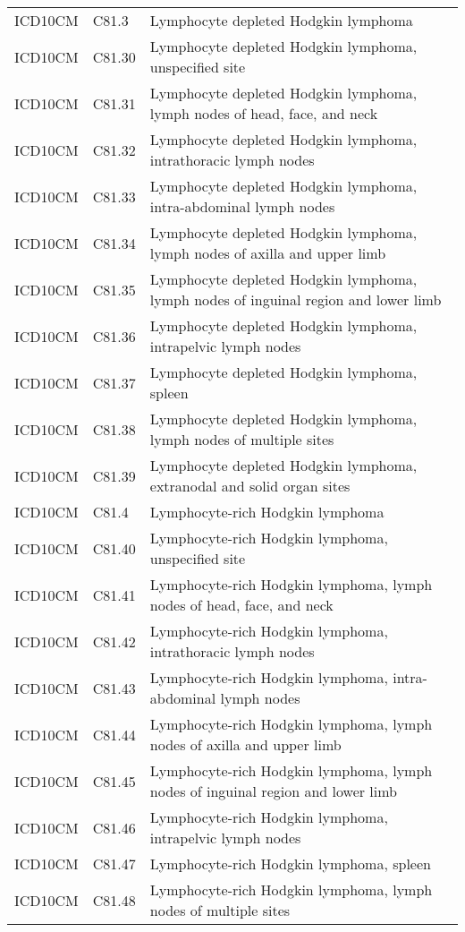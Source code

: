 \begin{longtable}{p{}p{}p{}}
  ICD10CM & C81.3 & Lymphocyte depleted Hodgkin lymphoma \\ 
  ICD10CM & C81.30 & Lymphocyte depleted Hodgkin lymphoma, unspecified site \\ 
  ICD10CM & C81.31 & Lymphocyte depleted Hodgkin lymphoma, lymph nodes of head, face, and neck \\ 
  ICD10CM & C81.32 & Lymphocyte depleted Hodgkin lymphoma, intrathoracic lymph nodes \\ 
  ICD10CM & C81.33 & Lymphocyte depleted Hodgkin lymphoma, intra-abdominal lymph nodes \\ 
  ICD10CM & C81.34 & Lymphocyte depleted Hodgkin lymphoma, lymph nodes of axilla and upper limb \\ 
  ICD10CM & C81.35 & Lymphocyte depleted Hodgkin lymphoma, lymph nodes of inguinal region and lower limb \\ 
  ICD10CM & C81.36 & Lymphocyte depleted Hodgkin lymphoma, intrapelvic lymph nodes \\ 
  ICD10CM & C81.37 & Lymphocyte depleted Hodgkin lymphoma, spleen \\ 
  ICD10CM & C81.38 & Lymphocyte depleted Hodgkin lymphoma, lymph nodes of multiple sites \\ 
  ICD10CM & C81.39 & Lymphocyte depleted Hodgkin lymphoma, extranodal and solid organ sites \\ 
  ICD10CM & C81.4 & Lymphocyte-rich Hodgkin lymphoma \\ 
  ICD10CM & C81.40 & Lymphocyte-rich Hodgkin lymphoma, unspecified site \\ 
  ICD10CM & C81.41 & Lymphocyte-rich Hodgkin lymphoma, lymph nodes of head, face, and neck \\ 
  ICD10CM & C81.42 & Lymphocyte-rich Hodgkin lymphoma, intrathoracic lymph nodes \\ 
  ICD10CM & C81.43 & Lymphocyte-rich Hodgkin lymphoma, intra-abdominal lymph nodes \\ 
  ICD10CM & C81.44 & Lymphocyte-rich Hodgkin lymphoma, lymph nodes of axilla and upper limb \\ 
  ICD10CM & C81.45 & Lymphocyte-rich Hodgkin lymphoma, lymph nodes of inguinal region and lower limb \\ 
  ICD10CM & C81.46 & Lymphocyte-rich Hodgkin lymphoma, intrapelvic lymph nodes \\ 
  ICD10CM & C81.47 & Lymphocyte-rich Hodgkin lymphoma, spleen \\ 
  ICD10CM & C81.48 & Lymphocyte-rich Hodgkin lymphoma, lymph nodes of multiple sites \\ 

\end{longtable}
